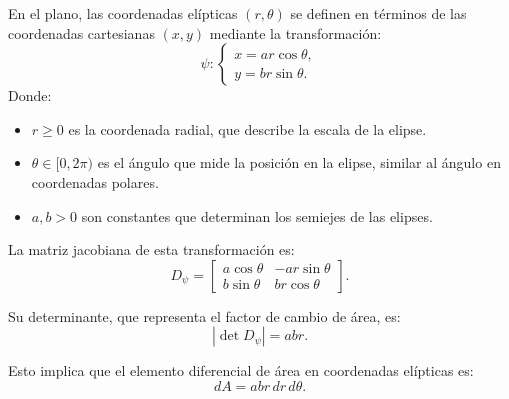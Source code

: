 



\begin{definición}
    En el plano, las coordenadas elípticas $(r, \theta)$ se definen en términos de las coordenadas cartesianas $(x, y)$ mediante la transformación:  
    $$ 
    \psi:
    \begin{cases} 
        x = a r \cos\theta, \\ 
        y = b r \sin\theta.
    \end{cases}
    $$  
    Donde:  
    \begin{itemize}
        \item $r \geq 0$ es la coordenada radial, que describe la escala de la elipse.
        \item $\theta \in [0, 2\pi)$ es el ángulo que mide la posición en la elipse, similar al ángulo en coordenadas polares.
        \item $a, b > 0$ son constantes que determinan los semiejes de las elipses.
    \end{itemize}
    
    La matriz jacobiana de esta transformación es:  
    $$
    D_\psi =
    \begin{bmatrix}
        a\cos\theta & -a r \sin\theta \\  
        b\sin\theta & b r \cos\theta  
    \end{bmatrix}.
    $$
    
    Su determinante, que representa el factor de cambio de área, es:  
    $$ 
    \left| \det D_\psi \right| = a b r.
    $$  
    
    Esto implica que el elemento diferencial de área en coordenadas elípticas es:  
    $$ 
    dA = a b r \, dr \, d\theta.
    $$  
    
\end{definición}


